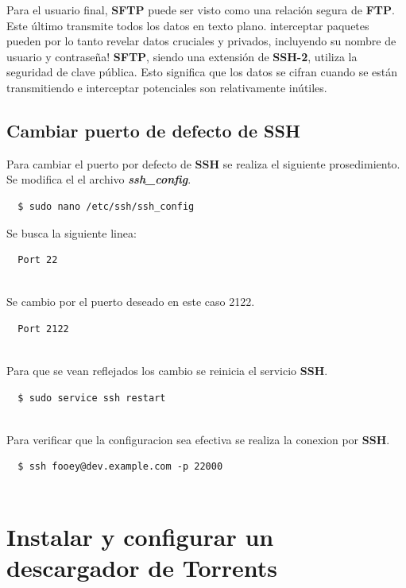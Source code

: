 \documentclass{article}
\begin{document}
Para el usuario final, \textbf{SFTP} puede ser visto como una relación segura de \textbf{FTP}. Este último transmite todos los datos en texto plano. interceptar paquetes pueden por lo tanto revelar datos cruciales y privados, incluyendo su nombre de usuario y contraseña! \textbf{SFTP}, siendo una extensión de \textbf{SSH-2}, utiliza la seguridad de clave pública. Esto significa que los datos se cifran cuando se están transmitiendo e interceptar potenciales son relativamente inútiles. 

\subsection{Cambiar puerto de defecto de SSH}
Para cambiar el puerto por defecto de \textbf{SSH} se realiza el siguiente prosedimiento. Se modifica el el archivo \textbf{\textit{ssh\_config}}.


\begin{verbatim}
  $ sudo nano /etc/ssh/ssh_config

\end{verbatim}

Se busca la siguiente linea:

\begin{verbatim}
  Port 22
  
\end{verbatim}

Se cambio por el puerto deseado en este caso 2122.

\begin{verbatim}
  Port 2122
  
\end{verbatim}

Para que se vean reflejados los cambio se reinicia el servicio \textbf{SSH}.

\begin{verbatim}
  $ sudo service ssh restart
  
\end{verbatim}

Para verificar que la configuracion sea efectiva se realiza la conexion por \textbf{SSH}.

\begin{verbatim}
  $ ssh fooey@dev.example.com -p 22000
  
\end{verbatim}

\section{Instalar y configurar un descargador de Torrents}
\end{document}
